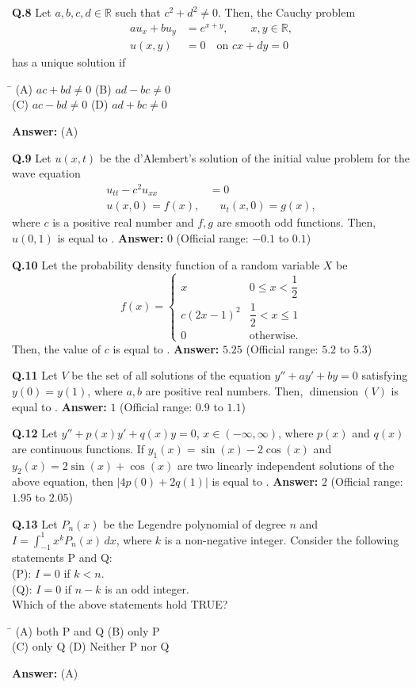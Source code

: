 \documentclass[11pt,a4paper]{article}
\newcommand{\optsfourA}[4]{%
  \begin{tabbing}
    \hspace{0.48\linewidth}\=\kill
    (A) #1 \> (B) #2 \\[2pt]
    (C) #3 \> (D) #4
  \end{tabbing}%
}
\newcommand{\ans}[1]{\textbf{Answer:} #1\par\medskip}
\begin{document}
\textbf{Q.8} Let $a, b, c, d \in \mathbb{R}$ such that $c^2 + d^2 \neq 0$. Then, the Cauchy problem
\begin{align*}
  a u_x + b u_y &= e^{x+y}, \qquad x, y \in \mathbb{R}, \\
  u(x, y) &= 0 \quad \text{on } cx + dy = 0
\end{align*}
has a unique solution if
\optsfourA{$ac + bd \neq 0$}{$ad - bc \neq 0$}{$ac - bd \neq 0$}{$ad + bc \neq 0$}
\ans{(A)}

\textbf{Q.9} Let $u(x, t)$ be the d'Alembert's solution of the initial value problem for the wave equation
\begin{align*}
  u_{tt} - c^2 u_{xx} &= 0 \\
  u(x, 0) = f(x), &\quad u_t(x, 0) = g(x),
\end{align*}
where $c$ is a positive real number and $f, g$ are smooth odd functions. Then, $u(0, 1)$ is equal to \underline{\hspace{2cm}}.
\ans{$0$ (Official range: $-0.1$ to $0.1$)}

\textbf{Q.10} Let the probability density function of a random variable $X$ be
\[
  f(x) = \begin{cases}
    x & 0 \le x < \dfrac{1}{2} \\[6pt]
    c(2x - 1)^2 & \dfrac{1}{2} < x \le 1 \\[4pt]
    0 & \text{otherwise.}
  \end{cases}
\]
Then, the value of $c$ is equal to \underline{\hspace{2cm}}.
\ans{$5.25$ (Official range: $5.2$ to $5.3$)}

\textbf{Q.11} Let $V$ be the set of all solutions of the equation $y'' + ay' + by = 0$ satisfying $y(0) = y(1)$, where $a, b$ are positive real numbers. Then, $\operatorname{dimension}(V)$ is equal to \underline{\hspace{2cm}}.
\ans{$1$ (Official range: $0.9$ to $1.1$)}

\textbf{Q.12} Let $y'' + p(x)y' + q(x)y = 0$, $x \in (-\infty, \infty)$, where $p(x)$ and $q(x)$ are continuous functions. If $y_1(x) = \sin(x) - 2\cos(x)$ and $y_2(x) = 2\sin(x) + \cos(x)$ are two linearly independent solutions of the above equation, then $|4p(0) + 2q(1)|$ is equal to \underline{\hspace{2cm}}.
\ans{$2$ (Official range: $1.95$ to $2.05$)}

\textbf{Q.13} Let $P_n(x)$ be the Legendre polynomial of degree $n$ and $I = \int_{-1}^{1} x^k P_n(x)\,dx$, where $k$ is a non-negative integer. Consider the following statements P and Q:\\
(P): $I = 0$ if $k < n$.\\
(Q): $I = 0$ if $n - k$ is an odd integer.\\
Which of the above statements hold TRUE?
\optsfourA{both P and Q}{only P}{only Q}{Neither P nor Q}
\ans{(A)}
\end{document}

